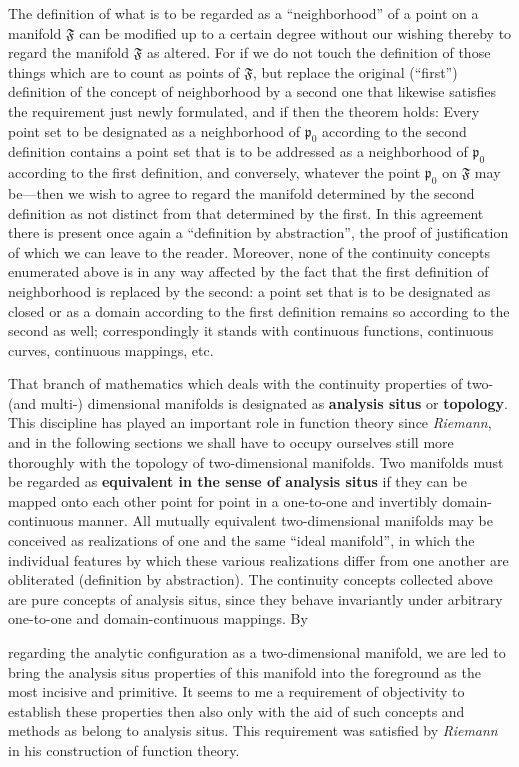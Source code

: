 \documentclass{article}
\begin{document}
The definition of what is to be regarded as a ``neighborhood'' of a point on a manifold $\mathfrak{F}$ can be modified up to a certain degree without our wishing thereby to regard the manifold $\mathfrak{F}$ as altered. For if we do not touch the definition of those things which are to count as points of $\mathfrak{F}$, but replace the original (``first'') definition of the concept of neighborhood by a second one that likewise satisfies the requirement just newly formulated, and if then the theorem holds: Every point set to be designated as a neighborhood of $\mathfrak{p}_0$ according to the second definition contains a point set that is to be addressed as a neighborhood of $\mathfrak{p}_0$ according to the first definition, and conversely, whatever the point $\mathfrak{p}_0$ on $\mathfrak{F}$ may be---then we wish to agree to regard the manifold determined by the second definition as not distinct from that determined by the first. In this agreement there is present once again a ``definition by abstraction'', the proof of justification of which we can leave to the reader. Moreover, none of the continuity concepts enumerated above is in any way affected by the fact that the first definition of neighborhood is replaced by the second: a point set that is to be designated as closed or as a domain according to the first definition remains so according to the second as well; correspondingly it stands with continuous functions, continuous curves, continuous mappings, etc.

That branch of mathematics which deals with the continuity properties of two- (and multi-) dimensional manifolds is designated as \textbf{analysis situs} or \textbf{topology}. This discipline has played an important role in function theory since \emph{Riemann}, and in the following sections we shall have to occupy ourselves still more thoroughly with the topology of two-dimensional manifolds. Two manifolds must be regarded as \textbf{equivalent in the sense of analysis situs} if they can be mapped onto each other point for point in a one-to-one and invertibly domain-continuous manner. All mutually equivalent two-dimensional manifolds may be conceived as realizations of one and the same ``ideal manifold'', in which the individual features by which these various realizations differ from one another are obliterated (definition by abstraction). The continuity concepts collected above are pure concepts of analysis situs, since they behave invariantly under arbitrary one-to-one and domain-continuous mappings. By

regarding the analytic configuration as a two-dimensional manifold, we are led to bring the analysis situs properties of this manifold into the foreground as the most incisive and primitive. It seems to me a requirement of objectivity to establish these properties then also only with the aid of such concepts and methods as belong to analysis situs. This requirement was satisfied by \emph{Riemann} in his construction of function theory.
\end{document}
